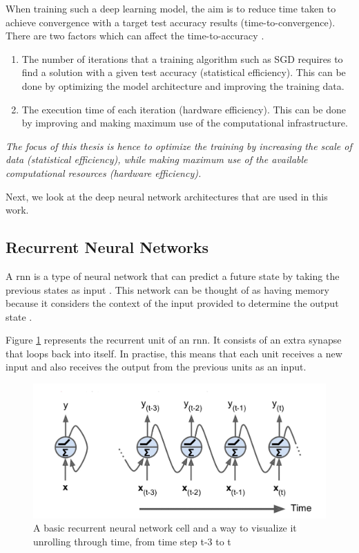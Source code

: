 When training such a deep learning model, the aim is to reduce time taken to achieve convergence with a target test accuracy results (time-to-convergence). There are two factors which can affect the time-to-accuracy \cite{Koliousis2019CROSSBOW:Servers}.
\begin{enumerate}
    \item The number of iterations that a training algorithm such as SGD requires to find a solution with a given test accuracy (statistical efficiency). This can be done by optimizing the model architecture and improving the training data.
    \item The execution time of each iteration (hardware efficiency). This can be done by improving and making maximum use of the computational infrastructure. 
\end{enumerate}

\emph{The focus of this thesis is hence to optimize the training by increasing the scale of data (statistical efficiency), while making maximum use of the available computational resources (hardware efficiency).} 
\newline

Next, we look at the deep neural network architectures that are used in this work. 
\subsection {Recurrent Neural Networks}
A \acrfull{rnn} is a type of neural network that can predict a future state by taking the previous states as input \cite{Graves2013SpeechNetworks}. This network can be thought of as having memory because it considers the context of the input provided to determine the output state \cite{Hagner2017RecurrentModel}.

Figure \ref{fig:rnn} represents the recurrent unit of an \acrshort{rnn}. It consists of an extra synapse that loops back into itself. In practise, this means that each unit receives a new input and also receives the output from the previous units as an input.
\begin{figure}[ht]
  \begin{center}
    \includegraphics[width=\textwidth]{images/rnn.png} 
    \caption{A basic recurrent neural network cell and a way to visualize it
unrolling through time, from time step t-3 to t \cite{Hagner2017RecurrentModel}}
    \label{fig:rnn}
  \end{center}
\end{figure}

